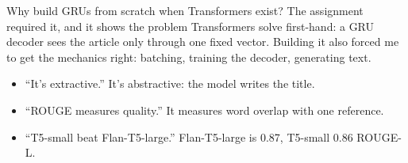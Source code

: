 \begin{iq}{Why build GRUs from scratch when Transformers exist?}
The assignment required it, and it shows the problem Transformers solve first-hand: a GRU decoder sees the article only through one fixed vector. Building it also forced me to get the mechanics right: batching, training the decoder, generating text.
\end{iq}

\begin{bugfix}
\begin{itemize}
  \item ``It's extractive.'' It's abstractive: the model writes the title.
  \item ``ROUGE measures quality.'' It measures word overlap with one reference.
  \item ``T5-small beat Flan-T5-large.'' Flan-T5-large is 0.87, T5-small 0.86 ROUGE-L.
\end{itemize}
\end{bugfix}
